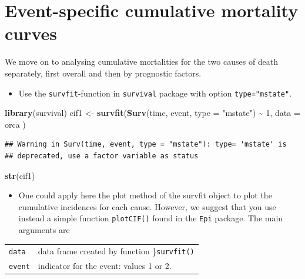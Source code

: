 \documentclass[
]{book}
\newenvironment{Shaded}{\begin{snugshade}}{\end{snugshade}}
\newcommand{\AttributeTok}[1]{\textcolor[rgb]{0.13,0.29,0.53}{#1}}
\newcommand{\DecValTok}[1]{\textcolor[rgb]{0.00,0.00,0.81}{#1}}
\newcommand{\FunctionTok}[1]{\textcolor[rgb]{0.13,0.29,0.53}{\textbf{#1}}}
\newcommand{\NormalTok}[1]{#1}
\newcommand{\OtherTok}[1]{\textcolor[rgb]{0.56,0.35,0.01}{#1}}
\newcommand{\SpecialCharTok}[1]{\textcolor[rgb]{0.81,0.36,0.00}{\textbf{#1}}}
\newcommand{\StringTok}[1]{\textcolor[rgb]{0.31,0.60,0.02}{#1}}
\newcounter{none} %
\providecommand{\tightlist}{%
  \setlength{\itemsep}{0pt}\setlength{\parskip}{0pt}}
\begin{document}
\section{Event-specific cumulative mortality curves}\label{event-specific-cumulative-mortality-curves}

We move on to analysing cumulative mortalities for the
two causes of death separately, first overall and then
by prognostic factors.

\begin{itemize}
\tightlist
\item
  Use the \texttt{survfit}-function in \texttt{survival} package with option \texttt{type="mstate"}.
\end{itemize}

\begin{Shaded}
\begin{Highlighting}[]
\FunctionTok{library}\NormalTok{(survival)}
\NormalTok{cif1 }\OtherTok{\textless{}{-}} \FunctionTok{survfit}\NormalTok{(}\FunctionTok{Surv}\NormalTok{(time, event, }\AttributeTok{type =} \StringTok{"mstate"}\NormalTok{) }\SpecialCharTok{\textasciitilde{}} \DecValTok{1}\NormalTok{,}
  \AttributeTok{data =}\NormalTok{ orca}
\NormalTok{)}
\end{Highlighting}
\end{Shaded}

\begin{verbatim}
## Warning in Surv(time, event, type = "mstate"): type= 'mstate' is
## deprecated, use a factor variable as status
\end{verbatim}

\begin{Shaded}
\begin{Highlighting}[]
\FunctionTok{str}\NormalTok{(cif1)}
\end{Highlighting}
\end{Shaded}

\begin{itemize}
\tightlist
\item
  One could apply here the plot method of the survfit object to plot the
  cumulative incidences for each cause. However, we suggest that you use
  instead a simple function \texttt{plotCIF()} found in the \texttt{Epi} package.
  The main arguments are
\end{itemize}

{\def\LTcaptype{none} %
\begin{longtable}[]{@{}ll@{}}
\toprule\noalign{}
\endhead
\bottomrule\noalign{}
\endlastfoot
\texttt{data} & data frame created by function \}\texttt{survfit()} \\
\texttt{event} & indicator for the event: values 1 or 2. \\
\end{longtable}
}
\end{document}
